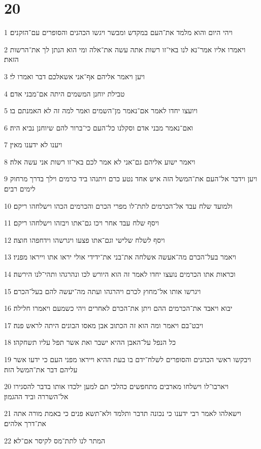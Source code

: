 \chapter{20}

\par 1 ויהי היום והוא מלמד את־העם במקדש ומבשר ויגשו הכהנים והסופרים עם־הזקנים׃
\par 2 ויאמרו אליו אמר־נא לנו באי־זו רשות אתה עשה את־אלה ומי הוא הנתן לך את־הרשות הזאת׃
\par 3 ויען ויאמר אליהם אף־אני אשאלכם דבר ואמרו לי׃
\par 4 טבילת יוחנן המשמים היתה אם־מבני אדם׃
\par 5 ויועצו יחדו לאמר אם־נאמר מן־השמים ואמר למה זה לא האמנתם בו׃
\par 6 ואם־נאמר מבני אדם וסקלנו כל־העם כי־ברור להם שיוחנן נביא היה׃
\par 7 ויענו לא ידענו מאין׃
\par 8 ויאמר ישוע אליהם גם־אני לא אמר לכם באי־זו רשות אני עשה אלה׃
\par 9 ויען וידבר אל־העם את־המשל הזה איש אחד נטע כרם ויתנהו ביד כרמים וילך בדרך מרחוק לימים רבים׃
\par 10 ולמועד שלח עבד אל־הכרמים לתת־לו מפרי הכרם והכרמים הכהו וישלחהו ריקם׃
\par 11 ויסף שלח עבד אחר ויכו גם־אתו ויבזהו וישלחהו ריקם׃
\par 12 ויסף לשלח שלישי וגם־אתו פצעו ויגרשהו וידחפהו חוצה׃
\par 13 ויאמר בעל־הכרם מה־אעשה אשלחה את־בני את־ידידי אולי יראו אתו וייראו מפניו׃
\par 14 וכראות אתו הכרמים נועצו יחדו לאמר זה הוא היורש לכו ונהרגהו ותהי־לנו הירשה׃
\par 15 ויגרשו אותו אל־מחוץ לכרם ויהרגהו ועתה מה־יעשה להם בעל־הכרם׃
\par 16 יבוא ויאבד את־הכרמים ההם ויתן את־הכרם לאחרים ויהי כשמעם ויאמרו חלילה׃
\par 17 ויבט־בם ויאמר ומה הוא זה הכתוב אבן מאסו הבונים היתה לראש פנה׃
\par 18 כל הנפל על־האבן ההיא ישבר ואת אשר תפל עליו תשחקהו׃
\par 19 ויבקשו ראשי הכהנים והסופרים לשלח־ידם בו בעת ההיא וייראו מפני העם כי ידעו אשר עליהם דבר את־המשל הזה׃
\par 20 ויארבו־לו וישלחו מארבים מתחפשים כהלכי תם למען ילכדו אותו בדבר להסגירו אל־השררה וביד ההגמון׃
\par 21 וישאלהו לאמר רבי ידענו כי נכונה תדבר ותלמד ולא־תשא פנים כי באמת מורה אתה את־דרך אלהים׃
\par 22 המתר לנו לתת־מס לקיסר אם־לא׃

